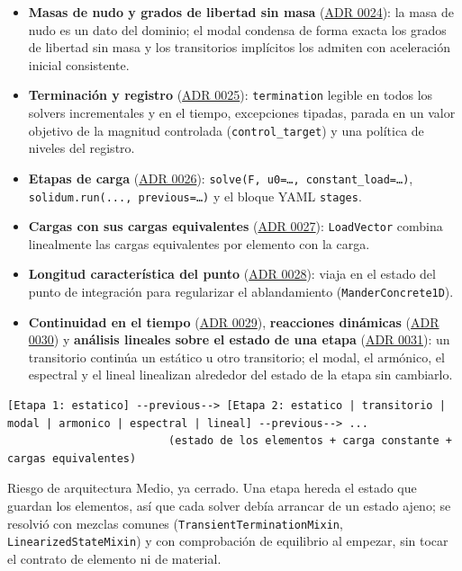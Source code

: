 \documentclass[11pt,oneside]{report}
\begin{document}
\begin{itemize}
  \item \textbf{Masas de nudo y grados de libertad sin masa} (\hyperref[adr:0024]{ADR 0024}): la masa de nudo es un dato del dominio; el modal condensa de forma exacta los grados de libertad sin masa y los transitorios implícitos los admiten con aceleración inicial consistente.
  \item \textbf{Terminación y registro} (\hyperref[adr:0025]{ADR 0025}): \texttt{termination} legible en todos los solvers incrementales y en el tiempo, excepciones tipadas, parada en un valor objetivo de la magnitud controlada (\texttt{control\_target}) y una política de niveles del registro.
  \item \textbf{Etapas de carga} (\hyperref[adr:0026]{ADR 0026}): \texttt{solve(F, u0=\ldots{}, constant\_\allowbreak{}load=\ldots{})}, \texttt{solidum.\allowbreak{}run(.\allowbreak{}.\allowbreak{}.\allowbreak{}, previous=\ldots{})} y el bloque YAML \texttt{stages}.
  \item \textbf{Cargas con sus cargas equivalentes} (\hyperref[adr:0027]{ADR 0027}): \texttt{LoadVector} combina linealmente las cargas equivalentes por elemento con la carga.
  \item \textbf{Longitud característica del punto} (\hyperref[adr:0028]{ADR 0028}): viaja en el estado del punto de integración para regularizar el ablandamiento (\texttt{ManderConcrete1D}).
  \item \textbf{Continuidad en el tiempo} (\hyperref[adr:0029]{ADR 0029}), \textbf{reacciones dinámicas} (\hyperref[adr:0030]{ADR 0030}) y \textbf{análisis lineales sobre el estado de una etapa} (\hyperref[adr:0031]{ADR 0031}): un transitorio continúa un estático u otro transitorio; el modal, el armónico, el espectral y el lineal linealizan alrededor del estado de la etapa sin cambiarlo.
\end{itemize}

\begin{lstlisting}
[Etapa 1: estatico] --previous--> [Etapa 2: estatico | transitorio | modal | armonico | espectral | lineal] --previous--> ...
                         (estado de los elementos + carga constante + cargas equivalentes)

\end{lstlisting}

\begin{infobox}{Riesgo de arquitectura}
Medio, ya cerrado. Una etapa hereda el estado que guardan los elementos, así que cada solver debía arrancar de un estado ajeno; se resolvió con mezclas comunes (\texttt{TransientTerminationMixin}, \texttt{LinearizedStateMixin}) y con comprobación de equilibrio al empezar, sin tocar el contrato de elemento ni de material.
\end{infobox}
\end{document}
